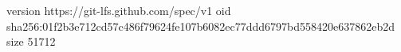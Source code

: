 version https://git-lfs.github.com/spec/v1
oid sha256:01f2b3e712cd57c486f79624fe107b6082ec77ddd6797bd558420e637862eb2d
size 51712
